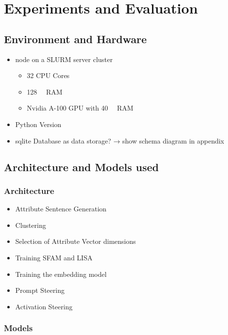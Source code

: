 \chapter{Experiments and Evaluation}
\label{sec:experiments_evaluation}


\section{Environment and Hardware}
\label{sec:experiments_evaluation:environmentHardware}

\begin{itemize}
  \item node on a SLURM server cluster
        \begin{itemize}
          \item 32 CPU Cores %
          \item \SI{128}{\giga\byte} RAM %
          \item Nvidia A-100 GPU with \SI{40}{\giga\byte} RAM
        \end{itemize}
  \item Python Version
  \item sqlite Database as data storage? → show schema diagram in appendix
\end{itemize}


\section{Architecture and Models used}
\label{sec:approach:architectureModels}

\subsection{Architecture}
\label{sec:approach:architectureModels:architecture}

\begin{itemize}
  \item Attribute Sentence Generation
  \item Clustering
  \item Selection of Attribute Vector dimensions
  \item Training SFAM and LISA
  \item Training the embedding model
  \item Prompt Steering
  \item Activation Steering
\end{itemize}

\subsection{Models}
\label{sec:approach:architectureModels:models}

